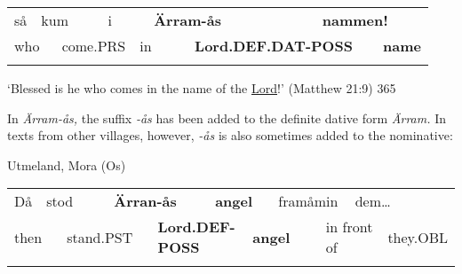 \begin{tabular}{llllllllll}
\lsptoprule
så & \multicolumn{2}{l}{kum

} & \multicolumn{2}{l}{i

} & \multicolumn{2}{l}{{\bfseries Ärram-ås}

} & \multicolumn{2}{l}{{\bfseries nammen!}

} & \\
\multicolumn{2}{l}{who

} & \multicolumn{2}{l}{come.PRS

} & \multicolumn{2}{l}{in

} & \multicolumn{2}{l}{{\bfseries Lord.DEF.DAT-POSS}

} & \multicolumn{2}{l}{{\bfseries name}

}\\
\lspbottomrule
\end{tabular}

\begin{styleTranslation}
‘Blessed is he who comes in the name of the \href{http://www.godrules.net/library/topics/topic1192.htm}{Lord}!’ (Matthew 21:9) 365

\end{styleTranslation}

\begin{styleBodyTextFirst}
In \textit{Ärram-ås,} the suffix\textit{ -å}\textit{s} has been added to the definite dative form \textit{Ärram. }In texts from other villages, however,\textit{ -å}\textit{s} is also sometimes added to the nominative:

\end{styleBodyTextFirst}

\begin{listWWNumileveli}
\item {}

\begin{styleExample}
Utmeland, Mora (Os)

\end{styleExample}

\end{listWWNumileveli}

\begin{tabular}{llllllllllll}
\lsptoprule
Då & \multicolumn{2}{l}{stod

} & \multicolumn{2}{l}{{\bfseries Ärran-ås}

} & \multicolumn{2}{l}{{\bfseries angel}

} & \multicolumn{2}{l}{framåmin

} & \multicolumn{2}{l}{dem…

} & \\
\multicolumn{2}{l}{then

} & \multicolumn{2}{l}{stand.PST

} & \multicolumn{2}{l}{{\bfseries Lord.DEF-POSS}

} & \multicolumn{2}{l}{{\bfseries angel}

} & \multicolumn{2}{l}{in front of

} & \multicolumn{2}{l}{they.OBL

}\\
\lspbottomrule
\end{tabular}

